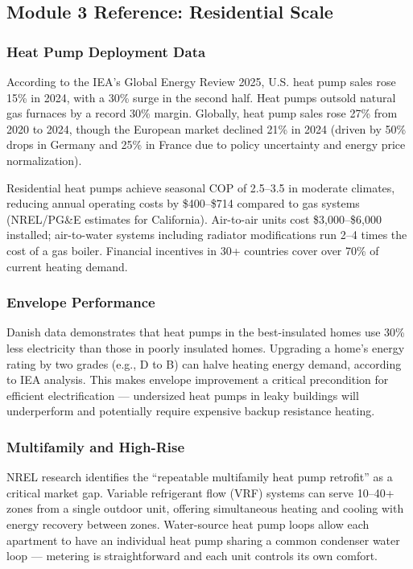 \documentclass[11pt,letterpaper]{article}
\begin{document}
\subsection{Module 3 Reference: Residential Scale}

\subsubsection{Heat Pump Deployment Data}
According to the IEA's Global Energy Review 2025, U.S. heat pump sales rose 15\% in 2024, with a 30\% surge in the second half. Heat pumps outsold natural gas furnaces by a record 30\% margin. Globally, heat pump sales rose 27\% from 2020 to 2024, though the European market declined 21\% in 2024 (driven by 50\% drops in Germany and 25\% in France due to policy uncertainty and energy price normalization).

Residential heat pumps achieve seasonal COP of 2.5--3.5 in moderate climates, reducing annual operating costs by \$400--\$714 compared to gas systems (NREL/PG\&E estimates for California). Air-to-air units cost \$3,000--\$6,000 installed; air-to-water systems including radiator modifications run 2--4 times the cost of a gas boiler. Financial incentives in 30+ countries cover over 70\% of current heating demand.

\subsubsection{Envelope Performance}
Danish data demonstrates that heat pumps in the best-insulated homes use 30\% less electricity than those in poorly insulated homes. Upgrading a home's energy rating by two grades (e.g., D to B) can halve heating energy demand, according to IEA analysis. This makes envelope improvement a critical precondition for efficient electrification --- undersized heat pumps in leaky buildings will underperform and potentially require expensive backup resistance heating.

\subsubsection{Multifamily and High-Rise}
NREL research identifies the ``repeatable multifamily heat pump retrofit'' as a critical market gap. Variable refrigerant flow (VRF) systems can serve 10--40+ zones from a single outdoor unit, offering simultaneous heating and cooling with energy recovery between zones. Water-source heat pump loops allow each apartment to have an individual heat pump sharing a common condenser water loop --- metering is straightforward and each unit controls its own comfort.
\end{document}
